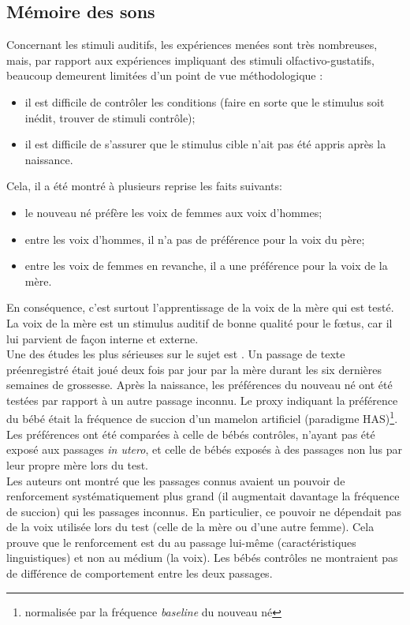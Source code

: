 \documentclass[french]{article}
\begin{document}
			\subsection{Mémoire des sons}
				Concernant les stimuli auditifs, les expériences menées sont très nombreuses, mais, par rapport aux expériences impliquant des stimuli olfactivo-gustatifs, beaucoup demeurent limitées d'un point de vue méthodologique \cite{james2010}:
				\begin{itemize}
					\item il est difficile de contrôler les conditions (faire en sorte que le stimulus soit inédit, trouver de stimuli contrôle);
					\item  il est difficile de s'assurer que le stimulus cible n'ait pas été appris après la naissance.
				\end{itemize}
				Cela, il a été montré à plusieurs reprise les faits suivants:
				\begin{itemize}
					\item le nouveau né préfère les voix de femmes aux voix d'hommes;
					\item entre les voix d'hommes, il n'a pas de préférence pour la voix du père;
					\item entre les voix de femmes en revanche, il a une préférence pour la voix de la mère.
				\end{itemize}
				En conséquence, c'est surtout l'apprentissage de la voix de la mère qui est testé. La voix de la mère est un stimulus auditif de bonne qualité pour le fœtus, car il lui parvient de façon interne et externe.\\
				
				Une des études les plus sérieuses sur le sujet est \cite{deCasper1986}. Un passage de texte préenregistré était joué deux fois par jour par la mère durant les six dernières semaines de grossesse. Après la naissance, les préférences du nouveau né ont été testées par rapport à un autre passage inconnu. Le proxy indiquant la préférence du bébé était la fréquence de succion d'un mamelon artificiel (paradigme HAS)\footnote{normalisée par la fréquence \textit{baseline} du nouveau né}. Les préférences ont été comparées à celle de bébés contrôles, n'ayant pas été exposé aux passages \textit{in utero}, et celle de bébés exposés à des passages non lus par leur propre mère lors du test.\\
				Les auteurs ont montré que les passages connus avaient un pouvoir de renforcement systématiquement plus grand (il augmentait davantage la fréquence de succion) qui les passages inconnus. En particulier, ce pouvoir ne dépendait pas de la voix utilisée lors du test (celle de la mère ou d'une autre femme). Cela prouve que le renforcement est du au passage lui-même (caractéristiques linguistiques) et non au médium (la voix). Les bébés contrôles ne montraient pas de différence de comportement entre les deux passages.\\
				
\end{document}

